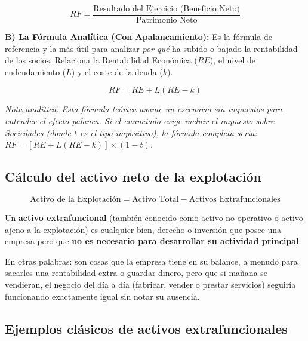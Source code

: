 \documentclass[12pt]{book} %
\begin{document}
\[RF = \frac{\text{Resultado del Ejercicio (Beneficio Neto)}}{\text{Patrimonio Neto}}\]

\textbf{B) La Fórmula Analítica (Con Apalancamiento):} Es la fórmula de
referencia y la más útil para analizar \emph{por qué} ha subido o bajado
la rentabilidad de los socios. Relaciona la Rentabilidad Económica
(\(RE\)), el nivel de endeudamiento (\(L\)) y el coste de la deuda
(\(k\)).

\[RF = RE + L(RE - k)\]

\emph{Nota analítica: Esta fórmula teórica asume un escenario sin
impuestos para entender el efecto palanca. Si el enunciado exige incluir
el impuesto sobre Sociedades (donde \(t\) es el tipo impositivo), la
fórmula completa sería: \(RF = [RE + L(RE - k)] \times (1 - t)\).}

\hypertarget{cuxe1lculo-del-activo-neto-de-la-explotaciuxf3n}{%
\subsection{Cálculo del activo neto de la
explotación}\label{cuxe1lculo-del-activo-neto-de-la-explotaciuxf3n}}

\[ \text{Activo de la Explotación} = \text{Activo Total} - \text{Activos Extrafuncionales} \]

Un \textbf{activo extrafuncional} (también conocido como activo no
operativo o activo ajeno a la explotación) es cualquier bien, derecho o
inversión que posee una empresa pero que \textbf{no es necesario para
desarrollar su actividad principal}.

En otras palabras: son cosas que la empresa tiene en su balance, a
menudo para sacarles una rentabilidad extra o guardar dinero, pero que
si mañana se vendieran, el negocio del día a día (fabricar, vender o
prestar servicios) seguiría funcionando exactamente igual sin notar su
ausencia.

\hypertarget{ejemplos-cluxe1sicos-de-activos-extrafuncionales}{%
\subsection{Ejemplos clásicos de activos
extrafuncionales}\label{ejemplos-cluxe1sicos-de-activos-extrafuncionales}}
\end{document}
